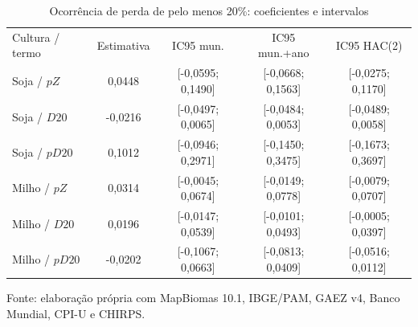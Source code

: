 \begin{table}[htbp]
\centering
\footnotesize
\setlength{\tabcolsep}{3pt}
\renewcommand{\arraystretch}{1.1}
\normalcaption\captionstyle{\centering}
\caption{Ocorrência de perda de pelo menos 20\%: coeficientes e intervalos}
\label{tab:h1-ocorrencia-etapa9}
\begin{tabular}{lcccc}
\hline
Cultura / termo & Estimativa & IC95 mun. & IC95 mun.+ano & IC95 HAC(2) \\
Soja / $pZ$ & 0,0448 & [-0,0595; 0,1490] & [-0,0668; 0,1563] & [-0,0275; 0,1170] \\
Soja / $D20$ & -0,0216 & [-0,0497; 0,0065] & [-0,0484; 0,0053] & [-0,0489; 0,0058] \\
Soja / $pD20$ & 0,1012 & [-0,0946; 0,2971] & [-0,1450; 0,3475] & [-0,1673; 0,3697] \\
Milho / $pZ$ & 0,0314 & [-0,0045; 0,0674] & [-0,0149; 0,0778] & [-0,0079; 0,0707] \\
Milho / $D20$ & 0,0196 & [-0,0147; 0,0539] & [-0,0101; 0,0493] & [-0,0005; 0,0397] \\
Milho / $pD20$ & -0,0202 & [-0,1067; 0,0663] & [-0,0813; 0,0409] & [-0,0516; 0,0112] \\
\hline\end{tabular}
\par\smallskip
\begin{minipage}{\textwidth}\footnotesize\centering
Fonte: elaboração própria com MapBiomas 10.1, IBGE/PAM, GAEZ v4, Banco Mundial, CPI-U e CHIRPS.
\end{minipage}
\end{table}
